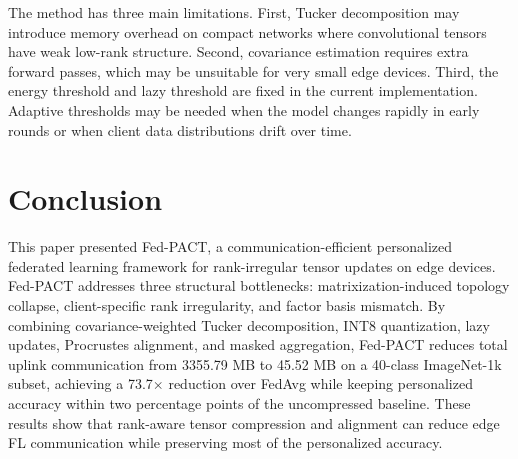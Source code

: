 \documentclass[conference]{IEEEtran}
\begin{document}
The method has three main limitations. First, Tucker decomposition may introduce memory overhead on compact networks where convolutional tensors have weak low-rank structure. Second, covariance estimation requires extra forward passes, which may be unsuitable for very small edge devices. Third, the energy threshold and lazy threshold are fixed in the current implementation. Adaptive thresholds may be needed when the model changes rapidly in early rounds or when client data distributions drift over time.
\section{Conclusion}
This paper presented Fed-PACT, a communication-efficient personalized federated learning framework for rank-irregular tensor updates on edge devices. Fed-PACT addresses three structural bottlenecks: matrixization-induced topology collapse, client-specific rank irregularity, and factor basis mismatch. By combining covariance-weighted Tucker decomposition, INT8 quantization, lazy updates, Procrustes alignment, and masked aggregation, Fed-PACT reduces total uplink communication from 3355.79 MB to 45.52 MB on a 40-class ImageNet-1k subset, achieving a 73.7$\times$ reduction over FedAvg while keeping personalized accuracy within two percentage points of the uncompressed baseline. 
These results show that rank-aware tensor compression and alignment can reduce edge FL communication while preserving most of the personalized accuracy.
\end{document}
